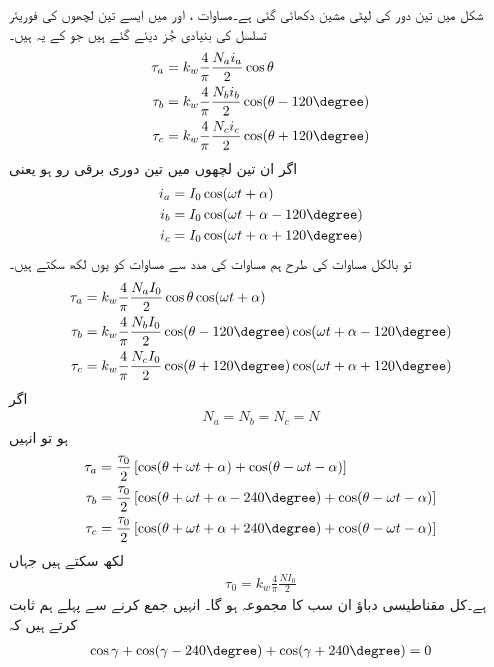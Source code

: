 شکل  میں تین دور کی لپٹی مشین دکھائی گئی ہے۔مساوات ،  اور  میں ایسے تین لچھوں کی فوریئر تسلسل کی بنیادی جُز دیئے گئے ہیں جو کے یہ ہیں۔
\begin{align}
\tau_a&=k_w \frac{4}{\pi}\frac{N_a i_a}{2}\cos \theta\\
\tau_b&=k_w \frac{4}{\pi}\frac{N_b i_b}{2}\cos (\theta-120\degree)\\
\tau_c&=k_w \frac{4}{\pi}\frac{N_c i_c}{2}\cos (\theta+120\degree)
\end{align}
اگر ان تین لچھوں میں تین دوری برقی رو ہو یعنی
\begin{align}
i_a&=I_0 \cos (\omega t+\alpha)\\
i_b&=I_0 \cos (\omega t +\alpha -120\degree)\\
i_c&=I_0 \cos (\omega t +\alpha +120\degree)
\end{align}
تو بالکل مساوات کی طرح ہم مساوات  کی مدد سے مساوات کو یوں لکھ سکتے ہیں۔
\begin{align}
\tau_a&=k_w \frac{4}{\pi}\frac{N_a I_0}{2} \cos \theta \cos (\omega t +\alpha)\\
\tau_b&=k_w \frac{4}{\pi}\frac{N_b I_0}{2} \cos (\theta -120\degree)\cos (\omega t +\alpha -120\degree)\\
\tau_c&=k_w \frac{4}{\pi}\frac{N_c I_0}{2} \cos (\theta +120\degree)\cos (\omega t +\alpha +120\degree)
\end{align}
اگر
\begin{align*}
N_a=N_b=N_c=N
\end{align*}
ہو تو انہیں
\begin{align}\label{مساوات_تبادلہ_تین_گھومتے_دباو}
\tau_a&=\frac{\tau_0}{2} \left[\cos (\theta +\omega t +\alpha) +\cos (\theta -\omega t -\alpha) \right]\\
\tau_b&=\frac{\tau_0}{2} \left[\cos (\theta +\omega t +\alpha-240\degree) +\cos (\theta -\omega t -\alpha) \right]\\
\tau_c&=\frac{\tau_0}{2} \left[\cos (\theta +\omega t +\alpha+240\degree) +\cos (\theta -\omega t -\alpha) \right]
\end{align}
لکھ سکتے ہیں جہاں
\begin{align}
\tau_0=k_w \frac{4}{\pi}\frac{N I_0}{2}
\end{align}
ہے۔کل مقناطیسی دباؤ  ان سب کا مجموعہ ہو گا۔ انہیں جمع کرنے سے پہلے ہم ثابت کرتے ہیں کہ
\begin{align*}
\cos \gamma +\cos (\gamma -240\degree)+\cos (\gamma+240\degree)=0
\end{align*}
